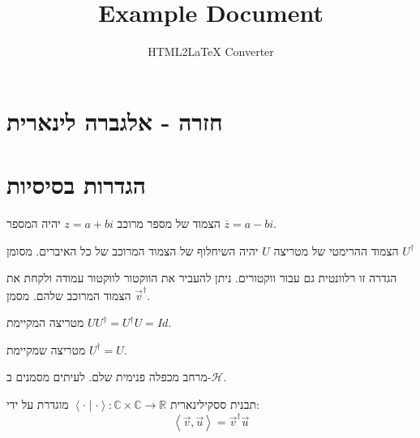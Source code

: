 \documentclass{tstextbook}
\begin{document}
\title{Example Document}
\author{HTML2LaTeX Converter}
\maketitle


\section{חזרה - אלגברה לינארית}

\section{הגדרות בסיסיות}

\begin{definition}
הצמוד של מספר מרוכב \(z=a+bi\) יהיה המספר \(\overline{z}=a-bi\).

\end{definition}
\begin{definition}
הצמוד ההרימטי של מטריצה \(U\) יהיה השיחלוף של הצמוד המרוכב של כל האיברים. מסומן \(U^{\dagger}\)

\end{definition}
\begin{remark}
הגדרה זו רלוונטית גם עבור ווקטורים. ניתן להעביר את הווקטור לווקטור עמודה ולקחת את הצמוד המרוכב שלהם. מסמן \(\vec{v}^{\dagger}\).

\end{remark}
\begin{definition}
מטריצה המקיימת \(U U^{\dagger}=U^{\dagger} U=Id\).

\end{definition}
\begin{definition}
מטריצה שמקיימת \(U^{\dagger}=U\).

\end{definition}
\begin{definition}
מרחב מכפלה פנימית שלם. לעיתים מסמנים ב-\(\mathcal{H}\).

\end{definition}
\begin{definition}
תבנית ססקילינארית \(\left\langle  \cdot \mid\cdot  \right\rangle:\mathbb{C}\times \mathbb{C}\to \mathbb{R}\) מוגדרת על ידי:
$$\left\langle  \vec{v},\vec{u}  \right\rangle ={\vec{v}}^{\dagger} \vec{u}$$

\end{definition}
\end{document}
